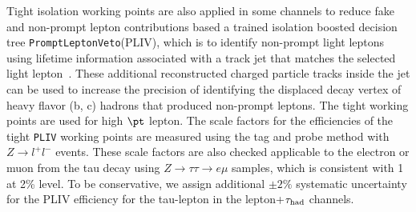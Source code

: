 Tight isolation working points are also applied in some channels to reduce fake and non-prompt lepton contributions based a trained isolation boosted decision tree \texttt{PromptLeptonVeto}(PLIV), which is to identify non-prompt light leptons using lifetime information associated with a track jet that matches the selected light lepton~\cite{ATLAS-CONF-2019-045}. These additional reconstructed charged particle tracks inside the jet can be
used to increase the precision of identifying the displaced decay vertex of heavy flavor (b, c) hadrons that produced non-prompt leptons.
The tight working points are used for high $\pt$ lepton.
The scale factors for the efficiencies of the tight \texttt{PLIV} working points are measured using the tag and probe method
with $Z\rightarrow l^+l^-$ events. These scale factors are also checked applicable to the electron or muon from the tau decay
using $Z\rightarrow\tau\tau\rightarrow e\mu$ samples, which is consistent with 1 at 2\% level. To be conservative, we assign
additional $\pm 2\%$ systematic uncertainty for the PLIV efficiency for the tau-lepton in the lepton+$\tau_\text{had}$ channels.

